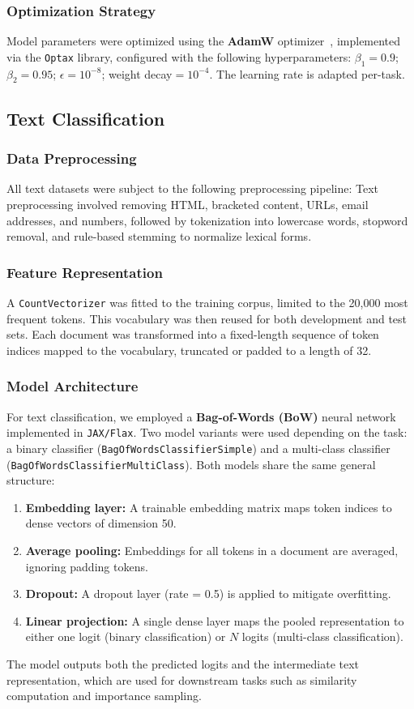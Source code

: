 \documentclass[sigconf,anonymous]{aamas}
\begin{document}
\subsubsection{Optimization Strategy}
Model parameters were optimized using the \textbf{AdamW} optimizer~\citep{loshchilov2017decoupled}, implemented via the \texttt{Optax} library, configured with the following hyperparameters:
$\beta_1{=}0.9$; $\beta_2{=}0.95$; $\epsilon{=}10^{-8}$; weight decay${=}10^{-4}$. The learning rate is adapted per-task.

\subsection{Text Classification}
\subsubsection{Data Preprocessing}
All text datasets were subject to the following preprocessing pipeline:
Text preprocessing involved removing HTML, bracketed content, URLs, email addresses, and numbers, followed by tokenization into lowercase words, stopword removal, and rule-based stemming to normalize lexical forms.

\subsubsection{Feature Representation}
A \texttt{CountVectorizer} was fitted to the training corpus, limited to the 20,000 most frequent tokens. This vocabulary was then reused for both development and test sets. Each document was transformed into a fixed-length sequence of token indices mapped to the vocabulary, truncated or padded to a length of 32.

\subsubsection{Model Architecture}
For text classification, we employed a \textbf{Bag-of-Words (BoW)} neural network implemented in \texttt{JAX/Flax}. Two model variants were used depending on the task: a binary classifier (\texttt{BagOfWordsClassifierSimple}) and a multi-class classifier (\texttt{BagOfWordsClassifierMultiClass}). Both models share the same general structure:
\begin{enumerate}
\item \textbf{Embedding layer:} A trainable embedding matrix maps token indices to dense vectors of dimension 50.
\item \textbf{Average pooling:} Embeddings for all tokens in a document are averaged, ignoring padding tokens.
\item \textbf{Dropout:} A dropout layer (rate = 0.5) is applied to mitigate overfitting.
\item \textbf{Linear projection:} A single dense layer maps the pooled representation to either one logit (binary classification) or $N$ logits (multi-class classification).
\end{enumerate}
The model outputs both the predicted logits and the intermediate text representation, which are used for downstream tasks such as similarity computation and importance sampling.
\end{document}
